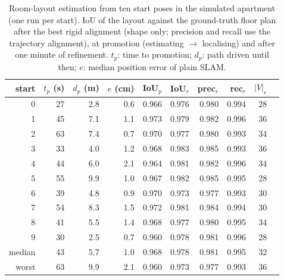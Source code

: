 \begin{table}[t]
\centering
\caption{Room-layout estimation from ten start poses in the simulated apartment (one run per start). IoU of the layout against the ground-truth floor plan after the best rigid alignment (shape only; precision and recall use the trajectory alignment), at promotion (estimating $\to$ localising) and after one minute of refinement. $t_p$: time to promotion; $d_p$: path driven until then; $e$: median position error of plain SLAM.}
\label{tab:estimation-campaign}
\begin{tabular}{r r r r r r r r r r}
\toprule
start & $t_p$ (s) & $d_p$ (m) & $e$ (cm) & IoU$_p$ & IoU$_r$ & prec$_r$ & rec$_r$ & $|V|_r$ \\
\midrule
0 & 27 & 2.8 & 0.6 & 0.966 & 0.976 & 0.980 & 0.994 & 28 \\
1 & 45 & 7.1 & 1.1 & 0.973 & 0.979 & 0.982 & 0.996 & 36 \\
2 & 63 & 7.4 & 0.7 & 0.970 & 0.977 & 0.980 & 0.993 & 34 \\
3 & 33 & 4.0 & 1.2 & 0.968 & 0.983 & 0.985 & 0.993 & 36 \\
4 & 44 & 6.0 & 2.1 & 0.964 & 0.981 & 0.982 & 0.996 & 34 \\
5 & 55 & 9.9 & 1.0 & 0.967 & 0.982 & 0.985 & 0.995 & 28 \\
6 & 39 & 4.8 & 0.9 & 0.970 & 0.973 & 0.977 & 0.993 & 30 \\
7 & 54 & 8.3 & 1.5 & 0.972 & 0.981 & 0.984 & 0.994 & 30 \\
8 & 41 & 5.5 & 1.4 & 0.968 & 0.977 & 0.980 & 0.995 & 34 \\
9 & 30 & 2.5 & 0.7 & 0.960 & 0.978 & 0.981 & 0.996 & 28 \\
\midrule
median & 43 & 5.7 & 1.0 & 0.968 & 0.978 & 0.981 & 0.995 & 32 \\
worst & 63 & 9.9 & 2.1 & 0.960 & 0.973 & 0.977 & 0.993 & 36 \\
\bottomrule
\end{tabular}
\end{table}
